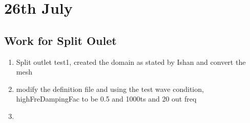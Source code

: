 \documentclass[12pt]{article} %
\begin{document}
\section{26th July}
\subsection{Work for Split Oulet}
\begin{enumerate}
    \item Split outlet test1, created the domain as stated by Ishan and convert the mesh
    \item modify the definition file and using the test wave condition, highFreDampingFac to be 0.5 and 1000ts and 20 out freq
    \item  
\end{enumerate}
\end{document}
